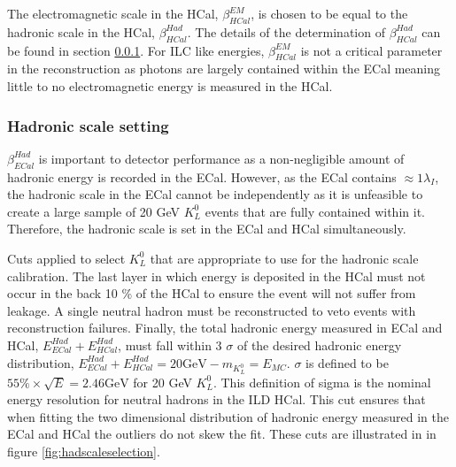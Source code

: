 The electromagnetic scale in the HCal, $\beta^{EM}_{HCal}$, is chosen to be equal to the hadronic scale in the HCal, $\beta^{Had}_{HCal}$.  The details of the determination of $\beta^{Had}_{HCal}$ can be found in section \ref{sec:hadscalesetting}.  For ILC like energies, $\beta^{EM}_{HCal}$ is not a critical parameter in the reconstruction as photons are largely contained within the ECal meaning little to no electromagnetic energy is measured in the HCal.  


\subsubsection{Hadronic scale setting}
\label{sec:hadscalesetting}
$\beta^{Had}_{ECal}$ is important to detector performance as a non-negligible amount of hadronic energy is recorded in the ECal.  However, as the ECal contains $\approx 1 \lambda_{I}$, the hadronic scale in the ECal cannot be independently as it is unfeasible to create a large sample of 20 GeV $K^{0}_{L}$ events that are fully contained within it.  Therefore, the hadronic scale is set in the ECal and HCal simultaneously.  

Cuts applied to select $K^{0}_{L}$ that are appropriate to use for the hadronic scale calibration.  The last layer in which energy is deposited in the HCal must not occur in the back 10 \% of the HCal to ensure the event will not suffer from leakage.  A single neutral hadron must be reconstructed to veto events with reconstruction failures.  Finally, the total hadronic energy measured in ECal and HCal, $E^{Had}_{ECal} + E^{Had}_{HCal}$, must fall within 3 $\sigma$ of the desired hadronic energy distribution, $E^{Had}_{ECal} + E^{Had}_{HCal} = 20 \text {GeV} - m_{K^{0}_{L}} = E_{MC}$.  $\sigma$ is defined to be $55\% \times \sqrt{E} = 2.46 \text{GeV}$ for 20 GeV $K^{0}_{L}$.  This definition of sigma is the nominal energy resolution for neutral hadrons in the ILD HCal.  This cut ensures that when fitting the two dimensional distribution of hadronic energy measured in the ECal and HCal the outliers do not skew the fit.  These cuts are illustrated in in figure \ref{fig:hadscaleselection}.

